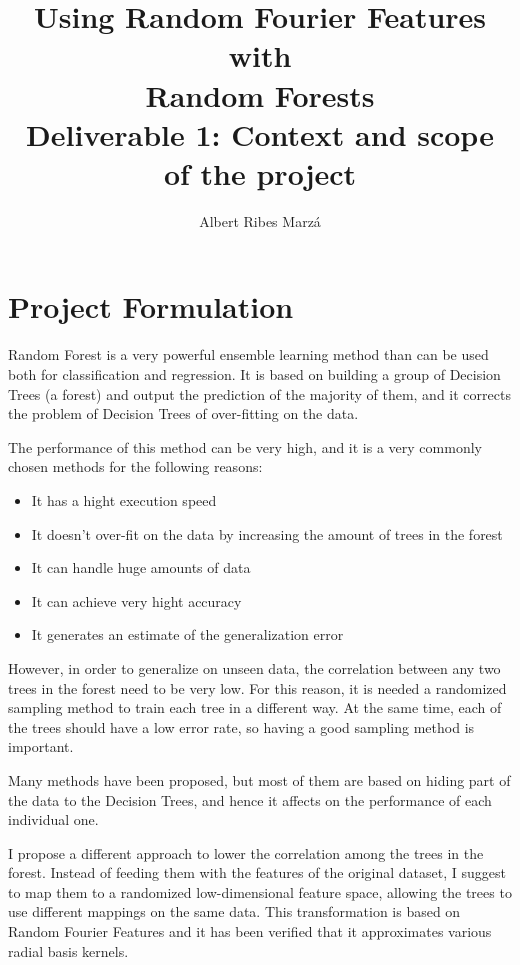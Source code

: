 \documentclass[a4paper]{article}
\title{
Using Random Fourier Features with \\ Random Forests \\
\large Deliverable 1: Context and scope of the project}
\author{Albert Ribes Marzá}
\begin{document}
    \maketitle
    \pagebreak

    \tableofcontents
    \pagebreak

    \section{Project Formulation}


    Random Forest is a very powerful ensemble learning method than can be used both for classification and regression. It is based on building a group of Decision Trees (a forest) and output the prediction of the majority of them, and it corrects the problem of Decision Trees of over-fitting on the data\cite{RF}.

    The performance of this method can be very high, and it is a very commonly chosen methods for the following reasons\cite{RF-MIT}:

    \begin{itemize}
        \item It has a hight execution speed
        \item It doesn't over-fit on the data by increasing the amount of trees in the forest
        \item It can handle huge amounts of data
        \item It can achieve very hight accuracy
        \item It generates an estimate of the generalization error
    \end{itemize}

    However, in order to generalize on unseen data, the correlation between any two trees in the forest need to be very low. For this reason, it is needed a randomized sampling method to train each tree in a different way. At the same time, each of the trees should have a low error rate, so having a good sampling method is important.

    Many methods have been proposed, but most of them are based on hiding part of the data to the Decision Trees, and hence it affects on the performance of each individual one.

    I propose a different approach to lower the correlation among the trees in the forest. Instead of feeding them with the features of the original dataset, I suggest to map them to a randomized low-dimensional feature space, allowing the trees to use different mappings on the same data. This transformation is based on Random Fourier Features and it has been verified that it approximates various radial basis kernels\cite{RFF}.
\end{document}
